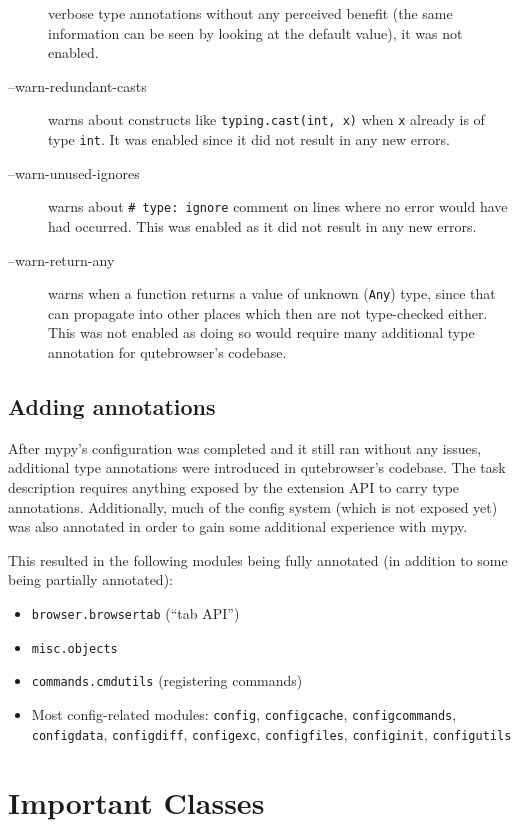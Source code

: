 \documentclass[a4paper,parskip=full]{scrreprt}
\newcommand{\py}[1]{\texttt{#1}}
\begin{document}
\begin{description}
    verbose type annotations without any perceived benefit (the same
    information can be seen by looking at the default value), it was not enabled.
  \item[--warn-redundant-casts] warns about constructs like \py{typing.cast(int,
      x)} when \py{x} already is of type \py{int}. It was enabled since it
    did not result in any new errors.
  \item[--warn-unused-ignores] warns about \texttt{# type: ignore}
    comment on lines where no error would have had occurred. This was enabled as
    it did not result in any new errors.
  \item[--warn-return-any] warns when a function returns a value of unknown
    (\verb|Any|) type, since that can propagate into other places which then are
    not type-checked either. This was not enabled as doing so would require many
    additional type annotation for qutebrowser's codebase.
\end{description}

\subsection{Adding annotations}

After mypy's configuration was completed and it still ran without any issues,
additional type annotations were introduced in qutebrowser's codebase. The task
description requires anything exposed by the extension API to carry type
annotations. Additionally, much of the config system (which is not exposed yet)
was also annotated in order to gain some additional experience with mypy.

This resulted in the following modules being fully annotated (in addition to
some being partially annotated):

\begin{itemize}
  \item \verb|browser.browsertab| (``tab API'')
  \item \verb|misc.objects|
  \item \verb|commands.cmdutils| (registering commands)
  \item Most config-related modules: \verb|config|, \verb|configcache|,
    \verb|configcommands|, \verb|configdata|, \verb|configdiff|,
    \verb|configexc|, \verb|configfiles|, \verb|configinit|, \verb|configutils|
\end{itemize}


\section{Important Classes}
\end{document}
